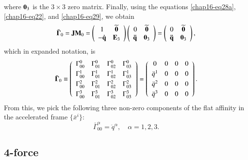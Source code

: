 where $\mathbf{0}_3$ is the $3\times3$ zero matrix. Finally, using the equations \eqref{chap16-eq28a}, \eqref{chap16-eq22}, and \eqref{chap16-eq29}, we obtain
\begin{equation}
\bar{\bm{\Gamma}}_0= {\mathbf{J}}{\mathbf{M}}_0=\left(\begin{array}{cc} 1 & \widetilde{\mathbf{0}}\\ -\mathbf{\dot{q}} & \mathbf{E}_3 \end{array}\right)
\left(\begin{array}{rc} 0 &\widetilde{\mathbf{0}} \\ \mathbf{\ddot{q}}  & \mathbf{0}_3 \end{array}\right) =\left(\begin{array}{cc}0&\widetilde{\mathbf{0}}\\
\mathbf{\ddot{q}}& \mathbf{0}_3 \end{array}\right),\label{chap16-eq30}
\end{equation}
which in expanded notation, is
\begin{equation}
\bar{\bm{\Gamma}}_0\equiv 
\left(\begin{array}{cccc}
\Gamma^0_{00}&\Gamma^0_{01}
&\Gamma^0_{02}&\Gamma^0_{03}\\[3pt]
\Gamma^1_{00}&\Gamma^1_{01}
&\Gamma^1_{02}&\Gamma^1_{03}\\[3pt]
\Gamma^2_{00}&\Gamma^2_{01}
&\Gamma^2_{02}&\Gamma^2_{03}\\[3pt]
\Gamma^3_{00}&\Gamma^3_{01}
&\Gamma^3_{02}&\Gamma^3_{03}
\end{array}\right)
= \left(\begin{array}{cccc} 
0&0&0&0\\[3pt]
{\ddot{q}}^1&0&0&0\\[3pt]
{\ddot{q}}^2&0&0&0\\[3pt]
{\ddot{q}}^3&0&0&0
\end{array}\right).\label{chap16-eq31}
\end{equation}
From this, we pick the following three non-zero components of the flat affinity in the accelerated frame $\{\bar{x}^i\}$:
\begin{equation}
\bar{\Gamma}^\alpha_{00}=\ddot{q}^\alpha,\quad \alpha=1,2,3.\label{chap16-eq32}
\end{equation}

\subsection{4-force}\label{chap16-sec6.6}

